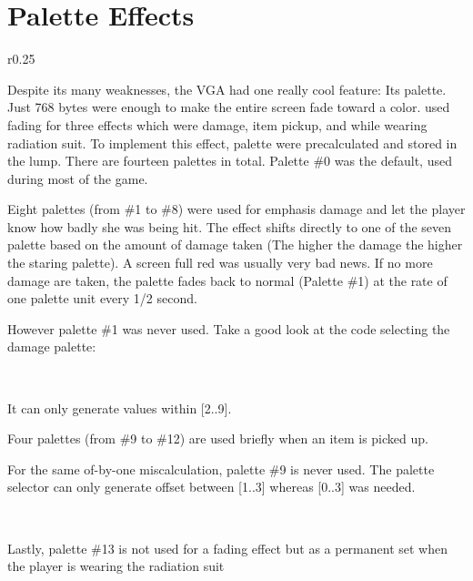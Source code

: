 \section{Palette Effects}
\label{label_palettes}
\begin{wrapfigure}[8]{r}{0.25\textwidth}
\centering
{}
\end{wrapfigure}

Despite its many weaknesses, the VGA had one really cool feature: Its palette. Just 768 bytes were enough to make the entire screen fade toward a color. \doom used fading for three effects which were damage, item pickup, and while wearing radiation suit. To implement this effect, palette were precalculated and stored in the  lump. There are fourteen palettes in total. Palette \#0 was the default, used during most of the game.\\
\par
Eight palettes (from \#1 to \#8) were used for emphasis damage and let the player know how badly she was being hit. The effect shifts directly to one of the seven palette based on the amount of damage taken (The higher the damage the higher the staring palette). A screen full red was usually very bad news. If no more damage are taken, the palette fades back to normal (Palette \#1) at the rate of one palette unit every 1/2 second.\\
\par
{}
\par
However palette \#1 was never used. Take a good look at the code selecting the damage palette:\\
\par
{}\\
\par
It can only generate values within [2..9].\\
\par
Four palettes (from \#9 to \#12) are used briefly when an item is picked up.\\
\par
{}
\par
For the same of-by-one miscalculation, palette \#9 is never used. The palette selector can only generate offset between [1..3] whereas [0..3] was needed.\\
\par
{}\\
\par
Lastly, palette \#13 is not used for a fading effect but as a permanent set when the player is wearing the radiation suit \\ \par

